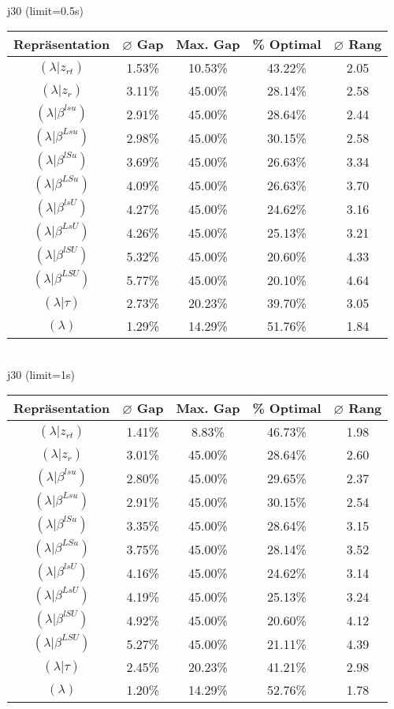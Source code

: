 \documentclass{scrartcl}
\begin{document}
\\[8pt]j30 (limit=0.5s)\\\begin{tabular}{ccccc}
\hline
Repräsentation & $\varnothing$ Gap & Max. Gap & \% Optimal & $\varnothing$ Rang\\[3pt]
\hline
$(\lambda|z_{rt})$&1.53\%&10.53\%&43.22\%&2.05\\
\hline
$(\lambda|z_r)$&3.11\%&45.00\%&28.14\%&2.58\\
\hline
$(\lambda|\beta^{lsu})$&2.91\%&45.00\%&28.64\%&2.44\\
\hline
$(\lambda|\beta^{Lsu})$&2.98\%&45.00\%&30.15\%&2.58\\
\hline
$(\lambda|\beta^{lSu})$&3.69\%&45.00\%&26.63\%&3.34\\
\hline
$(\lambda|\beta^{LSu})$&4.09\%&45.00\%&26.63\%&3.70\\
\hline
$(\lambda|\beta^{lsU})$&4.27\%&45.00\%&24.62\%&3.16\\
\hline
$(\lambda|\beta^{LsU})$&4.26\%&45.00\%&25.13\%&3.21\\
\hline
$(\lambda|\beta^{lSU})$&5.32\%&45.00\%&20.60\%&4.33\\
\hline
$(\lambda|\beta^{LSU})$&5.77\%&45.00\%&20.10\%&4.64\\
\hline
$(\lambda|\tau)$&2.73\%&20.23\%&39.70\%&3.05\\
\hline
$(\lambda)$&1.29\%&14.29\%&51.76\%&1.84\\\hline
\end{tabular}
\\[8pt]
\newpage
j30 (limit=1s)\\\begin{tabular}{ccccc}
\hline
Repräsentation & $\varnothing$ Gap & Max. Gap & \% Optimal & $\varnothing$ Rang\\[3pt]
\hline
$(\lambda|z_{rt})$&1.41\%&8.83\%&46.73\%&1.98\\
\hline
$(\lambda|z_r)$&3.01\%&45.00\%&28.64\%&2.60\\
\hline
$(\lambda|\beta^{lsu})$&2.80\%&45.00\%&29.65\%&2.37\\
\hline
$(\lambda|\beta^{Lsu})$&2.91\%&45.00\%&30.15\%&2.54\\
\hline
$(\lambda|\beta^{lSu})$&3.35\%&45.00\%&28.64\%&3.15\\
\hline
$(\lambda|\beta^{LSu})$&3.75\%&45.00\%&28.14\%&3.52\\
\hline
$(\lambda|\beta^{lsU})$&4.16\%&45.00\%&24.62\%&3.14\\
\hline
$(\lambda|\beta^{LsU})$&4.19\%&45.00\%&25.13\%&3.24\\
\hline
$(\lambda|\beta^{lSU})$&4.92\%&45.00\%&20.60\%&4.12\\
\hline
$(\lambda|\beta^{LSU})$&5.27\%&45.00\%&21.11\%&4.39\\
\hline
$(\lambda|\tau)$&2.45\%&20.23\%&41.21\%&2.98\\
\hline
$(\lambda)$&1.20\%&14.29\%&52.76\%&1.78\\\hline
\end{tabular}
\end{document}
